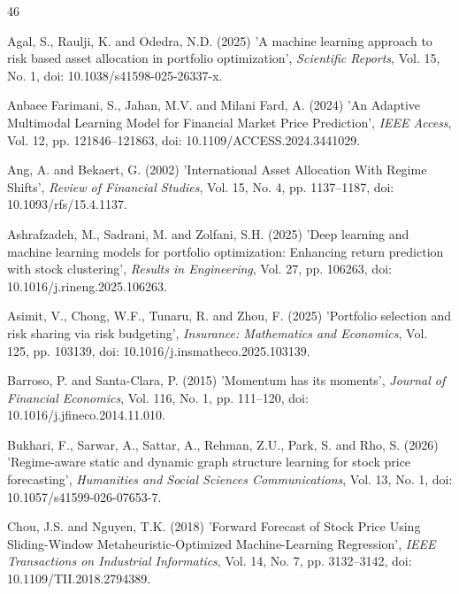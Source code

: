 \begin{thebibliography}{46}

Agal, S., Raulji, K. and Odedra, N.D. (2025) 'A machine learning approach to risk based asset allocation in portfolio optimization', {\it Scientific Reports}, Vol. 15, No. 1, doi: 10.1038/s41598-025-26337-x.

Anbaee Farimani, S., Jahan, M.V. and Milani Fard, A. (2024) 'An Adaptive Multimodal Learning Model for Financial Market Price Prediction', {\it IEEE Access}, Vol. 12, pp. 121846--121863, doi: 10.1109/ACCESS.2024.3441029.

Ang, A. and Bekaert, G. (2002) 'International Asset Allocation With Regime Shifts', {\it Review of Financial Studies}, Vol. 15, No. 4, pp. 1137--1187, doi: 10.1093/rfs/15.4.1137.

Ashrafzadeh, M., Sadrani, M. and Zolfani, S.H. (2025) 'Deep learning and machine learning models for portfolio optimization: Enhancing return prediction with stock clustering', {\it Results in Engineering}, Vol. 27, pp. 106263, doi: 10.1016/j.rineng.2025.106263.

Asimit, V., Chong, W.F., Tunaru, R. and Zhou, F. (2025) 'Portfolio selection and risk sharing via risk budgeting', {\it Insurance: Mathematics and Economics}, Vol. 125, pp. 103139, doi: 10.1016/j.insmatheco.2025.103139.

Barroso, P. and Santa-Clara, P. (2015) 'Momentum has its moments', {\it Journal of Financial Economics}, Vol. 116, No. 1, pp. 111--120, doi: 10.1016/j.jfineco.2014.11.010.

Bukhari, F., Sarwar, A., Sattar, A., Rehman, Z.U., Park, S. and Rho, S. (2026) 'Regime-aware static and dynamic graph structure learning for stock price forecasting', {\it Humanities and Social Sciences Communications}, Vol. 13, No. 1, doi: 10.1057/s41599-026-07653-7.

Chou, J.S. and Nguyen, T.K. (2018) 'Forward Forecast of Stock Price Using Sliding-Window Metaheuristic-Optimized Machine-Learning Regression', {\it IEEE Transactions on Industrial Informatics}, Vol. 14, No. 7, pp. 3132--3142, doi: 10.1109/TII.2018.2794389.


\end{thebibliography}
